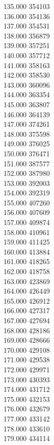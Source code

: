 { 135.000	354103 \\
 136.000	354136 \\
 137.000	354531 \\
 138.000	356879 \\
 139.000	357251 \\
 140.000	357712 \\
 141.000	358163 \\
 142.000	358530 \\
 143.000	360096 \\
 144.000	363354 \\
 145.000	363807 \\
 146.000	364139 \\
 147.000	374261 \\
 148.000	375598 \\
 149.000	376025 \\
 150.000	376471 \\
 151.000	387577 \\
 152.000	387980 \\
 153.000	392003 \\
 154.000	392319 \\
 155.000	407260 \\
 156.000	407609 \\
 157.000	409874 \\
 158.000	410961 \\
 159.000	411425 \\
 160.000	413884 \\
 161.000	418265 \\
 162.000	418758 \\
 163.000	423869 \\
 164.000	426449 \\
 165.000	426912 \\
 166.000	427317 \\
 167.000	427694 \\
 168.000	428186 \\
 169.000	428666 \\
 170.000	429108 \\
 171.000	429538 \\
 172.000	429971 \\
 173.000	430393 \\
 174.000	431712 \\
 175.000	432153 \\
 176.000	432679 \\
 177.000	433142 \\
 178.000	433610 \\
 179.000	434114 \\
}

